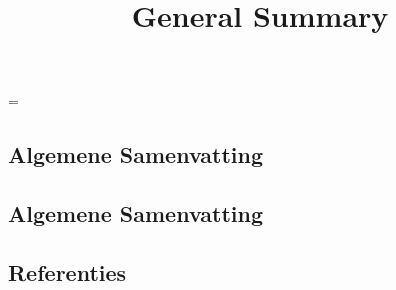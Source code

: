 \emergencystretch=\maxdimen
{}


\begin{refsection}

\title{General Summary}

\chapter{Algemene Samenvatting}

\vspace{-2cm}

\section*{Algemene Samenvatting}

\begin{abstract}

\end{abstract}

\newpage
\AddLabels


\section*{Referenties}

\printbibliography[heading=none]

\end{refsection}
\RemoveLabels
